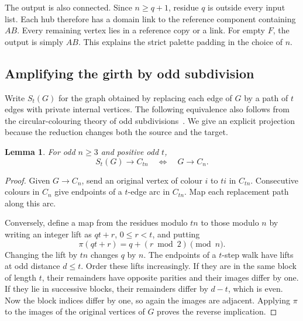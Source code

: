 \documentclass[11pt]{article}
\newtheorem{lemma}[theorem]{Lemma}
\theoremstyle{remark}
\begin{document}
The output is also connected. Since $n\geq q+1$, residue $q$ is outside
every input list. Each hub therefore has a domain link to the reference
component containing $AB$. Every remaining vertex lies in a reference
copy or a link. For empty $F$, the output is simply $AB$. This explains
the strict palette padding in the choice of $n$.

\subsection{Amplifying the girth by odd subdivision}\label{sec:amplify}
Write $S_t(G)$ for the graph obtained by replacing each edge of $G$ by a
path of $t$ edges with private internal vertices. The following equivalence
also follows from the circular-colouring theory of odd
subdivisions~\cite{ht2014}. We give an explicit projection because the
reduction changes both the source and the target.

\begin{lemma}\label{lem:subdivision}
For odd $n\geq3$ and positive odd $t$,
\[
  S_t(G)\to C_{tn}\quad\Longleftrightarrow\quad G\to C_n .
\]
\end{lemma}
\begin{proof}
Given $G\to C_n$, send an original vertex of colour $i$ to $ti$ in
$C_{tn}$. Consecutive colours in $C_n$ give endpoints of a $t$-edge arc
in $C_{tn}$. Map each replacement path along this arc.

Conversely, define a map from the residues modulo $tn$ to those modulo $n$
by writing an integer lift as $qt+r$, $0\leq r<t$, and putting
\[
  \pi(qt+r)=q+(r\bmod 2)\pmod n .
\]
Changing the lift by $tn$ changes $q$ by $n$. The endpoints of a $t$-step
walk have lifts at odd distance $d\leq t$. Order these lifts increasingly.
If they are in the same block of length $t$, their remainders have
opposite parities and their images differ by one. If they lie in successive
blocks, their remainders differ by $d-t$, which is even. Now the block
indices differ by one, so again the images are adjacent. Applying $\pi$ to
the images of the original vertices of $G$ proves the reverse implication.
\end{proof}
\end{document}
